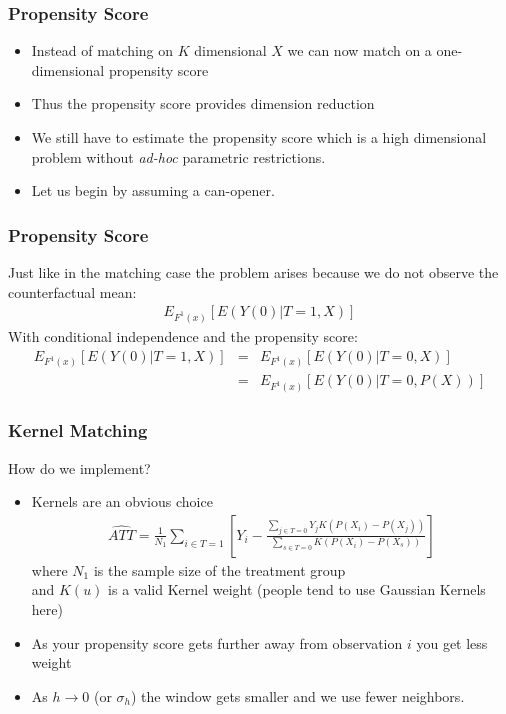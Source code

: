 \documentclass[xcolor=pdftex,dvipsnames,table,mathserif,aspectratio=169]{beamer}
\begin{document}
\begin{frame}
\frametitle{Propensity Score}
\begin{itemize}
\item Instead of matching on $K$ dimensional $X$ we can now match on a one-dimensional propensity score
\item Thus the propensity score provides \alert{dimension reduction}
\item We still have to estimate the propensity score which is a high dimensional problem without \textit{ad-hoc} parametric restrictions.
\item Let us begin by assuming a can-opener.
\end{itemize}
\end{frame}


\begin{frame}
\frametitle{Propensity Score}
Just like in the matching case the problem arises because we do not observe the counterfactual mean:
\begin{eqnarray*}
 E_{F^1(x)} [E(Y(0) | T=1,X)] 
\end{eqnarray*}
With conditional independence and the propensity score:
\begin{eqnarray*}
 E_{F^1(x)} [E(Y(0) | T=1,X)]  &=&  E_{F^1(x)} [E(Y(0) | T=0,X)] \\
 &=&  E_{F^1(x)} [E(Y(0) | T=0,P(X))] 
\end{eqnarray*}
\end{frame}

\begin{frame}
\frametitle{Kernel Matching}
How do we implement?
\begin{itemize}
\item Kernels are an obvious choice
\begin{eqnarray*}
\widehat{ATT} = \frac{1}{N_1} \sum_{i \in T=1} \left[Y_i - \frac{\sum_{j \in T=0} Y_j K\left(P(X_i) - P(X_j) \right) }{\sum_{s \in T=0}  K\left(P(X_i) - P(X_s) \right)}   \right]
\end{eqnarray*}
 where $N_1$ is the sample size of the treatment group \\
 and $K(u)$ is a valid Kernel weight (people tend to use Gaussian Kernels here)
\item As your propensity score gets further away from observation $i$ you get less weight
\item As $h \rightarrow 0$  (or $\sigma_h$) the window gets smaller and we use fewer neighbors.
\end{itemize}
\end{frame}
\end{document}
